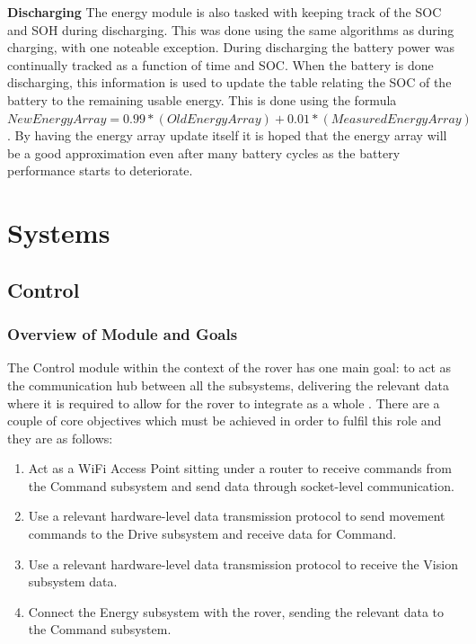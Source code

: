 \documentclass[a4paper]{article}
\begin{document}
\textbf{Discharging}
\vspace{10pt} 
\newline
The energy module is also tasked with keeping track of the SOC and SOH during discharging.
This was done using the same algorithms as during charging, with one noteable exception.
During discharging the battery power was continually tracked as a function of time and
SOC. When the battery is done discharging, this information is used to update the table
relating the SOC of the battery to the remaining usable energy. This is done using the
formula \( New Energy Array = 0.99*(Old Energy Array) + 0.01*(Measured Energy Array) \). 
By having the energy array update itself it is hoped that the energy array will be a good
approximation even after many battery cycles as the battery performance starts to deteriorate.










\section{Systems}

\subsection{Control}
 
\subsubsection{Overview of Module and Goals}
The Control module within the context of the rover has one main goal: 
to act as the communication hub between all the subsystems, delivering
the relevant data where it is required to allow for the rover to integrate
as a whole \cite{MarsRoverSpec}. There are a couple of core objectives which must be 
achieved in order to fulfil this role and they are as follows:

\begin{enumerate}
    \item Act as a WiFi Access Point sitting under a router to receive
    commands from the Command subsystem and send data through socket-level communication.
    \item Use a relevant hardware-level data transmission protocol to
    send movement commands to the Drive subsystem and receive data for Command. 
    \item Use a relevant hardware-level data transmission protocol to receive
    the Vision subsystem data.
    \item Connect the Energy subsystem with the rover, sending the relevant data
    to the Command subsystem.
\end{enumerate}
\end{document}
